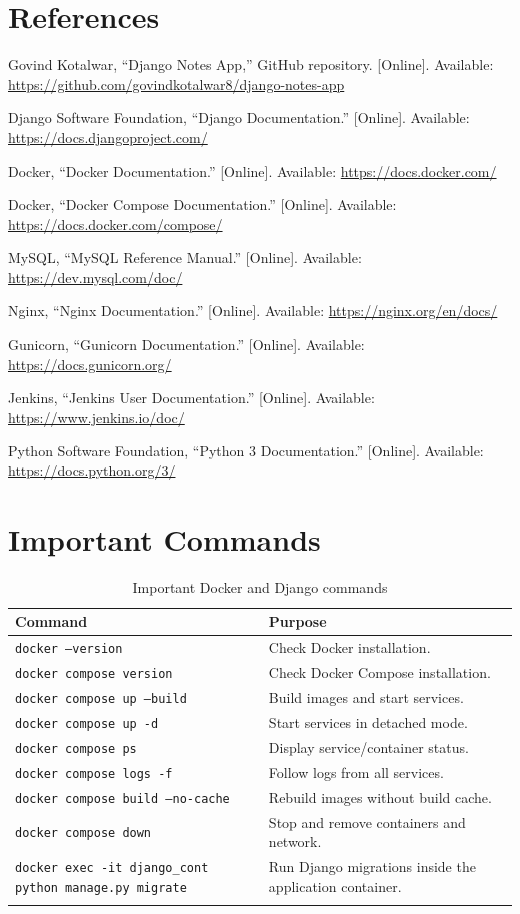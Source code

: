 \documentclass[12pt,a4paper,oneside]{report}
\begin{document}
\chapter*{References}
\begin{enumerate}[label={[\arabic*]},leftmargin=0.45in]
\item Govind Kotalwar, ``Django Notes App,'' GitHub repository. [Online]. Available: \url{https://github.com/govindkotalwar8/django-notes-app}
\item Django Software Foundation, ``Django Documentation.'' [Online]. Available: \url{https://docs.djangoproject.com/}
\item Docker, ``Docker Documentation.'' [Online]. Available: \url{https://docs.docker.com/}
\item Docker, ``Docker Compose Documentation.'' [Online]. Available: \url{https://docs.docker.com/compose/}
\item MySQL, ``MySQL Reference Manual.'' [Online]. Available: \url{https://dev.mysql.com/doc/}
\item Nginx, ``Nginx Documentation.'' [Online]. Available: \url{https://nginx.org/en/docs/}
\item Gunicorn, ``Gunicorn Documentation.'' [Online]. Available: \url{https://docs.gunicorn.org/}
\item Jenkins, ``Jenkins User Documentation.'' [Online]. Available: \url{https://www.jenkins.io/doc/}
\item Python Software Foundation, ``Python 3 Documentation.'' [Online]. Available: \url{https://docs.python.org/3/}
\end{enumerate}

\appendix
\chapter{Important Commands}
\begin{longtable}{|p{}|p{}|}
\hline
\textbf{Command} & \textbf{Purpose}\\ \hline
\texttt{docker --version} & Check Docker installation.\\ \hline
\texttt{docker compose version} & Check Docker Compose installation.\\ \hline
\texttt{docker compose up --build} & Build images and start services.\\ \hline
\texttt{docker compose up -d} & Start services in detached mode.\\ \hline
\texttt{docker compose ps} & Display service/container status.\\ \hline
\texttt{docker compose logs -f} & Follow logs from all services.\\ \hline
\texttt{docker compose build --no-cache} & Rebuild images without build cache.\\ \hline
\texttt{docker compose down} & Stop and remove containers and network.\\ \hline
\texttt{docker exec -it django\_cont python manage.py migrate} & Run Django migrations inside the application container.\\ \hline
\caption{Important Docker and Django commands}
\end{longtable}
\end{document}
